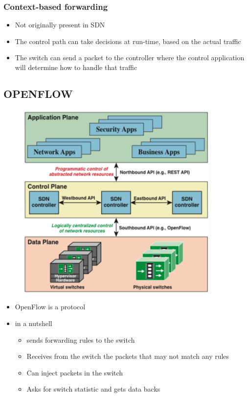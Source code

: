 \documentclass{article}
\begin{document}
\subsubsection{Context-based forwarding}
  \begin{itemize}
    \item Not originally present in SDN
    \item The control path can take decisions at run-time, based on the actual traffic
    \item The switch can send a packet to the controller where the control application will determine how to handle that traffic
  \end{itemize}

\subsection{OPENFLOW}
\begin{figure}[h]
    \centering
    \includegraphics[width=0.90\textwidth]{figure/SDN_architecture.png}
\end{figure}
\begin{itemize}
    \item OpenFlow is a protocol
    \item in a nutshell
    \begin{itemize}
        \item sends forwarding rules to the switch
        \item Receives from the switch the packets that may not match any rules
        \item Can inject packets in the switch
        \item Asks for switch statistic and gets data backs
    \end{itemize}
\end{itemize}
\end{document}
